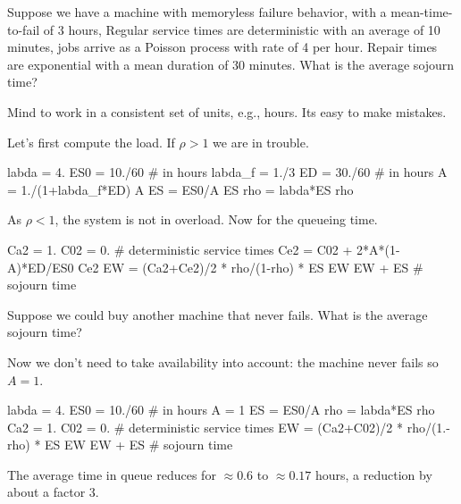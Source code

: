 \begin{exercise}
  Suppose we have a machine with memoryless failure behavior, with a mean-time-to-fail of $3$ hours, Regular service times are deterministic with an average of 10 minutes, jobs arrive as a Poisson process with rate of 4 per hour.  Repair times are exponential with a mean duration of 30 minutes. What is the average sojourn time?
  \begin{hint}
    Mind to work in a consistent set of units, e.g., hours. Its easy to make mistakes. 
  \end{hint}
  \begin{solution}
Let's first compute the load. If $\rho>1$ we are in trouble.
    \begin{pyconsole}
labda = 4.
ES0 = 10./60 # in hours
labda_f = 1./3
ED = 30./60 # in hours
A = 1./(1+labda_f*ED)
A
ES = ES0/A
ES
rho = labda*ES
rho
    \end{pyconsole}
As $\rho<1$, the system is not in overload. Now for the queueing time.
\begin{pyconsole}
Ca2 = 1.
C02 = 0. # deterministic service times
Ce2 = C02 + 2*A*(1-A)*ED/ES0
Ce2
EW = (Ca2+Ce2)/2 * rho/(1-rho) * ES
EW
EW + ES # sojourn time
\end{pyconsole}
  \end{solution}
\end{exercise}

\begin{exercise}
  Suppose we could buy another machine that never fails. What is the average sojourn time?
  \begin{solution}
Now we don't need to take availability into account: the machine never fails so $A=1$. 
    \begin{pyconsole}
labda = 4.
ES0 = 10./60 # in hours
A = 1
ES = ES0/A
rho = labda*ES
rho
Ca2 = 1.
C02 = 0. # deterministic service times
EW = (Ca2+C02)/2 * rho/(1.-rho) * ES
EW
EW + ES # sojourn time
\end{pyconsole}
The average time in queue reduces for $\approx 0.6$ to $\approx 0.17$ hours, a reduction by about a factor 3. 
\end{solution}
\end{exercise}







